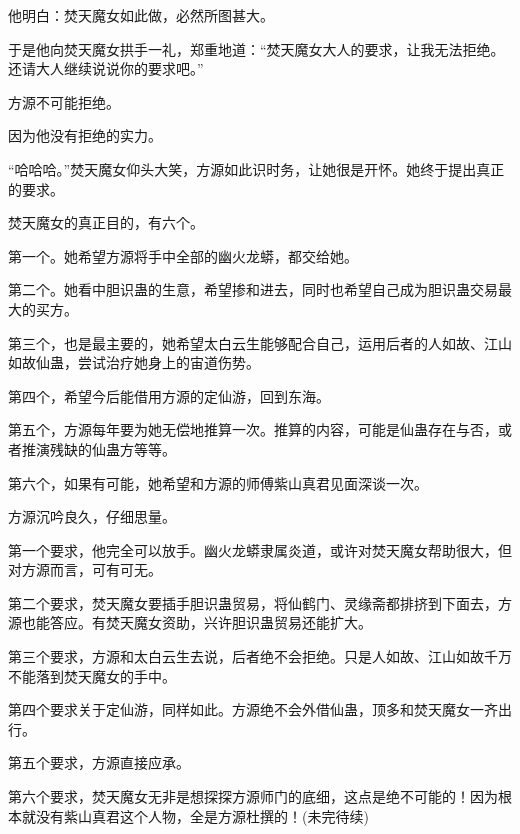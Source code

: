 \begin{this_body}
他明白：焚天魔女如此做，必然所图甚大。

于是他向焚天魔女拱手一礼，郑重地道：“焚天魔女大人的要求，让我无法拒绝。还请大人继续说说你的要求吧。”

方源不可能拒绝。

因为他没有拒绝的实力。

“哈哈哈。”焚天魔女仰头大笑，方源如此识时务，让她很是开怀。她终于提出真正的要求。

焚天魔女的真正目的，有六个。

第一个。她希望方源将手中全部的幽火龙蟒，都交给她。

第二个。她看中胆识蛊的生意，希望掺和进去，同时也希望自己成为胆识蛊交易最大的买方。

第三个，也是最主要的，她希望太白云生能够配合自己，运用后者的人如故、江山如故仙蛊，尝试治疗她身上的宙道伤势。

第四个，希望今后能借用方源的定仙游，回到东海。

第五个，方源每年要为她无偿地推算一次。推算的内容，可能是仙蛊存在与否，或者推演残缺的仙蛊方等等。

第六个，如果有可能，她希望和方源的师傅紫山真君见面深谈一次。

方源沉吟良久，仔细思量。

第一个要求，他完全可以放手。幽火龙蟒隶属炎道，或许对焚天魔女帮助很大，但对方源而言，可有可无。

第二个要求，焚天魔女要插手胆识蛊贸易，将仙鹤门、灵缘斋都排挤到下面去，方源也能答应。有焚天魔女资助，兴许胆识蛊贸易还能扩大。

第三个要求，方源和太白云生去说，后者绝不会拒绝。只是人如故、江山如故千万不能落到焚天魔女的手中。

第四个要求关于定仙游，同样如此。方源绝不会外借仙蛊，顶多和焚天魔女一齐出行。

第五个要求，方源直接应承。

第六个要求，焚天魔女无非是想探探方源师门的底细，这点是绝不可能的！因为根本就没有紫山真君这个人物，全是方源杜撰的！(未完待续)

\end{this_body}

